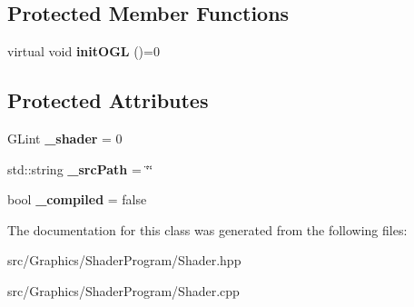 \subsection*{Protected Member Functions}
\begin{DoxyCompactItemize}
\item 
\hypertarget{class_shader_a36de02e8a601c40666bf321f9154577d}{virtual void {\bfseries init\+O\+G\+L} ()=0}\label{class_shader_a36de02e8a601c40666bf321f9154577d}

\end{DoxyCompactItemize}
\subsection*{Protected Attributes}
\begin{DoxyCompactItemize}
\item 
\hypertarget{class_shader_acfef8f5054c8d125f081168b10a38279}{G\+Lint {\bfseries \+\_\+shader} = 0}\label{class_shader_acfef8f5054c8d125f081168b10a38279}

\item 
\hypertarget{class_shader_ac9c918e30c0bb925ab3b39ca3da2db3f}{std\+::string {\bfseries \+\_\+src\+Path} = \char`\"{}\char`\"{}}\label{class_shader_ac9c918e30c0bb925ab3b39ca3da2db3f}

\item 
\hypertarget{class_shader_a0dd6e68a31c1ec8b086a5a6df666823b}{bool {\bfseries \+\_\+compiled} = false}\label{class_shader_a0dd6e68a31c1ec8b086a5a6df666823b}

\end{DoxyCompactItemize}


The documentation for this class was generated from the following files\+:\begin{DoxyCompactItemize}
\item 
src/\+Graphics/\+Shader\+Program/Shader.\+hpp\item 
src/\+Graphics/\+Shader\+Program/Shader.\+cpp\end{DoxyCompactItemize}
